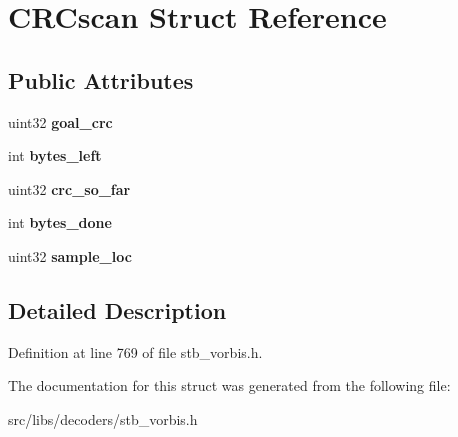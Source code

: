 \hypertarget{structCRCscan}{\section{C\-R\-Cscan Struct Reference}
\label{structCRCscan}
}
\subsection*{Public Attributes}
\begin{DoxyCompactItemize}
\item 
\hypertarget{structCRCscan_a530cd3f5d8a6ee4c095e405695b54d04}{uint32 {\bfseries goal\-\_\-crc}}\label{structCRCscan_a530cd3f5d8a6ee4c095e405695b54d04}

\item 
\hypertarget{structCRCscan_a8cfbc584d3b4344d02e5d64b50447d1e}{int {\bfseries bytes\-\_\-left}}\label{structCRCscan_a8cfbc584d3b4344d02e5d64b50447d1e}

\item 
\hypertarget{structCRCscan_a2604a61beb2f4718d2c0c5641264cebe}{uint32 {\bfseries crc\-\_\-so\-\_\-far}}\label{structCRCscan_a2604a61beb2f4718d2c0c5641264cebe}

\item 
\hypertarget{structCRCscan_a74ee9da9e00c74c1f519d31a2d042457}{int {\bfseries bytes\-\_\-done}}\label{structCRCscan_a74ee9da9e00c74c1f519d31a2d042457}

\item 
\hypertarget{structCRCscan_a444610761de18db38c7664e702a5e29a}{uint32 {\bfseries sample\-\_\-loc}}\label{structCRCscan_a444610761de18db38c7664e702a5e29a}

\end{DoxyCompactItemize}


\subsection{Detailed Description}


Definition at line 769 of file stb\-\_\-vorbis.\-h.



The documentation for this struct was generated from the following file\-:\begin{DoxyCompactItemize}
\item 
src/libs/decoders/stb\-\_\-vorbis.\-h\end{DoxyCompactItemize}
